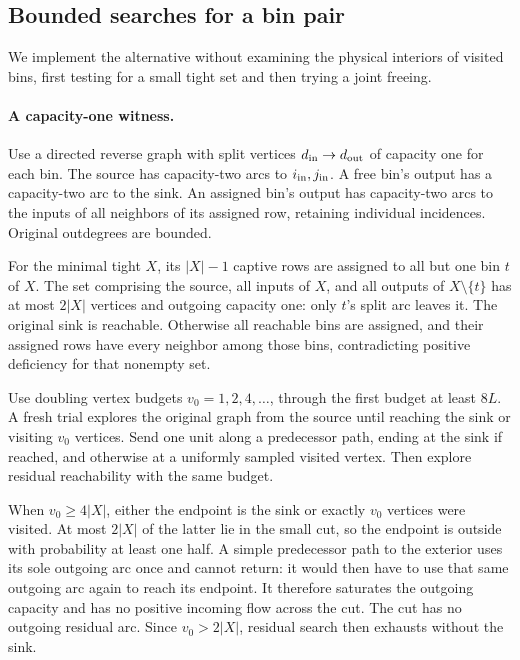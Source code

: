 \subsection{Bounded searches for a bin pair}

We implement the alternative without examining the physical interiors
of visited bins, first testing for a small tight set and then trying
a joint freeing.

\paragraph{A capacity-one witness.}
Use a directed reverse graph with split vertices
\(d_{\rm in}\to d_{\rm out}\) of capacity one for each bin.
The source has capacity-two arcs to \(i_{\rm in},j_{\rm in}\).
A free bin's output has a capacity-two arc to the sink.
An assigned bin's output has capacity-two arcs to the inputs
of all neighbors of its assigned row, retaining individual incidences.
Original outdegrees are bounded.

For the minimal tight \(X\), its \(|X|-1\) captive rows are assigned
to all but one bin \(t\) of \(X\).  The set comprising the source,
all inputs of \(X\), and all outputs of \(X\setminus\{t\}\)
has at most \(2|X|\) vertices and outgoing capacity one: only
\(t\)'s split arc leaves it.  The original sink is reachable.
Otherwise all reachable bins are assigned, and their assigned rows
have every neighbor among those bins, contradicting positive
deficiency for that nonempty set.

Use doubling vertex budgets \(v_0=1,2,4,\ldots\), through the first
budget at least \(8L\).  A fresh trial explores the original graph
from the source until reaching the sink or visiting \(v_0\) vertices.
Send one unit along a predecessor path, ending at the sink if reached,
and otherwise at a uniformly sampled visited vertex.
Then explore residual reachability with the same budget.

When \(v_0\ge4|X|\), either the endpoint is the sink or exactly
\(v_0\) vertices were visited.  At most \(2|X|\) of the latter
lie in the small cut, so the endpoint is outside with probability
at least one half.  A simple predecessor path to the exterior
uses its sole outgoing arc once and cannot return: it would then
have to use that same outgoing arc again to reach its endpoint.
It therefore saturates the outgoing capacity and has no positive
incoming flow across the cut.  The cut has no outgoing residual arc.
Since \(v_0>2|X|\), residual search then exhausts without the sink.

